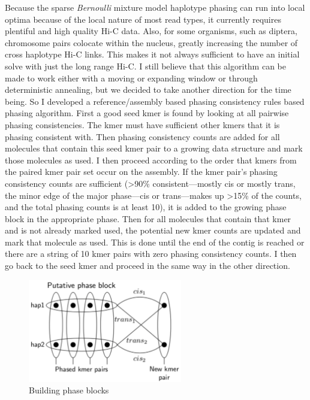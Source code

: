 {\par{
Because the sparse \textit{Bernoulli} mixture model haplotype phasing can run into local optima because of the local nature of most read types, it currently requires plentiful and high quality Hi-C data. Also, for some organisms, such as diptera, chromosome pairs colocate within the nucleus\cite{somaticpairing}, greatly increasing the number of cross haplotype Hi-C links. This makes it not always sufficient to have an initial solve with just the long range Hi-C. I still believe that this algorithm can be made to work either with a moving or expanding window or through deterministic annealing, but we decided to take another direction for the time being. So I developed a reference/assembly based phasing consistency rules based phasing algorithm. First a good seed kmer is found by looking at all pairwise phasing consistencies. The kmer must have sufficient other kmers that it is phasing consistent with. Then phasing consistency counts are added for all molecules that contain this seed kmer pair to a growing data structure and mark those molecules as used. I then proceed according to the order that kmers from the paired kmer pair set occur on the assembly. If the kmer pair's phasing consistency counts are sufficient (>90\% consistent---mostly cis or mostly trans, the minor edge of the major phase---cis or trans---makes up >15\% of the counts, and the total phasing counts is at least 10), it is added to the growing phase block in the appropriate phase. Then for all molecules that contain that kmer and is not already marked used, the potential new kmer counts are updated and mark that molecule as used. This is done until the end of the contig is reached or there are a string of 10 kmer pairs with zero phasing consistency counts. I then go back to the seed kmer and proceed in the same way in the other direction.
}

\begin{figure}[htbp!]
\caption{Building phase blocks}
\label{figure:phaseblocks}
\begin{centering}
\includegraphics[width=0.6\textwidth]{phaseblockbuilding.png}
\end{centering}
\end{figure}

}
